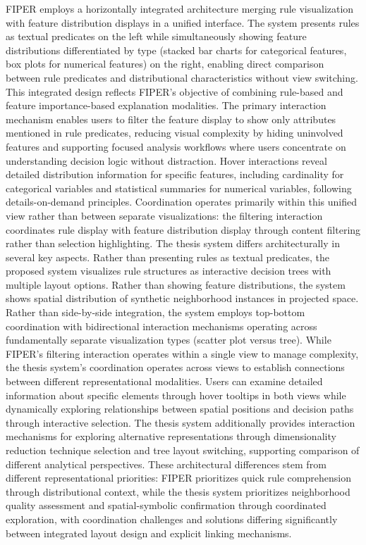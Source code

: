 FIPER \cite{cappuccio2024fipervisualbasedexplanationcombining} employs a horizontally integrated architecture merging rule visualization with feature distribution displays in a unified interface. The system presents rules as textual predicates on the left while simultaneously showing feature distributions differentiated by type (stacked bar charts for categorical features, box plots for numerical features) on the right, enabling direct comparison between rule predicates and distributional characteristics without view switching. This integrated design reflects FIPER's objective of combining rule-based and feature importance-based explanation modalities. The primary interaction mechanism enables users to filter the feature display to show only attributes mentioned in rule predicates, reducing visual complexity by hiding uninvolved features and supporting focused analysis workflows where users concentrate on understanding decision logic without distraction. Hover interactions reveal detailed distribution information for specific features, including cardinality for categorical variables and statistical summaries for numerical variables, following details-on-demand principles. Coordination operates primarily within this unified view rather than between separate visualizations: the filtering interaction coordinates rule display with feature distribution display through content filtering rather than selection highlighting. The thesis system differs architecturally in several key aspects. Rather than presenting rules as textual predicates, the proposed system visualizes rule structures as interactive decision trees with multiple layout options. Rather than showing feature distributions, the system shows spatial distribution of synthetic neighborhood instances in projected space. Rather than side-by-side integration, the system employs top-bottom coordination with bidirectional interaction mechanisms operating across fundamentally separate visualization types (scatter plot versus tree). While FIPER's filtering interaction operates within a single view to manage complexity, the thesis system's coordination operates across views to establish connections between different representational modalities. Users can examine detailed information about specific elements through hover tooltips in both views while dynamically exploring relationships between spatial positions and decision paths through interactive selection. The thesis system additionally provides interaction mechanisms for exploring alternative representations through dimensionality reduction technique selection and tree layout switching, supporting comparison of different analytical perspectives. These architectural differences stem from different representational priorities: FIPER prioritizes quick rule comprehension through distributional context, while the thesis system prioritizes neighborhood quality assessment and spatial-symbolic confirmation through coordinated exploration, with coordination challenges and solutions differing significantly between integrated layout design and explicit linking mechanisms.


